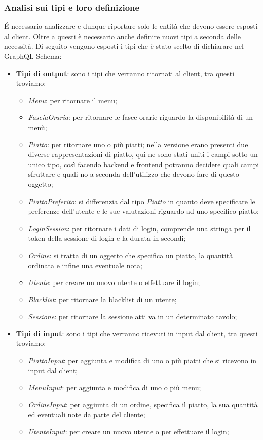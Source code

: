 \subsubsection*{Analisi sui tipi e loro definizione}
É necessario analizzare e dunque riportare solo le entità che devono essere esposti al client. Oltre a questi è necessario anche definire nuovi tipi a seconda delle necessità. Di seguito vengono esposti i tipi che è stato scelto di dichiarare nel GraphQL Schema:
\begin{itemize}
  \item \textbf{Tipi di output}: sono i tipi che verranno ritornati al client, tra questi troviamo:
  \begin{itemize}
    \item \textit{Menu}: per ritornare il menu;
    \item \textit{FasciaOraria}: per ritornare le fasce orarie riguardo la disponibilità di un menù;
    \item \textit{Piatto}: per ritornare uno o più piatti; nella versione erano presenti due diverse rappresentazioni di piatto, qui ne sono stati uniti i campi sotto un unico tipo, così facendo backend e frontend potranno decidere quali campi sfruttare e quali no a seconda dell'utilizzo che devono fare di questo oggetto;
    \item \textit{PiattoPreferito}: si differenzia dal tipo \textit{Piatto} in quanto deve specificare le preferenze dell'utente e le sue valutazioni riguardo ad uno specifico piatto;
    \item \textit{LoginSession}: per ritornare i dati di login, comprende una stringa per il token della sessione di login e la durata in secondi;
    \item \textit{Ordine}: si tratta di un oggetto che specifica un piatto, la quantità ordinata e infine una eventuale nota;
    \item \textit{Utente}: per creare un nuovo utente o effettuare il login;
    \item \textit{Blacklist}: per ritornare la blacklist di un utente;
    \item \textit{Sessione}: per ritornare la sessione atti va in un determinato tavolo;
  \end{itemize}
  \item \textbf{Tipi di input}: sono i tipi che verranno ricevuti in input dal client, tra questi troviamo:
  \begin{itemize}
    \item \textit{PiattoInput}: per aggiunta e modifica di uno o più piatti che si ricevono in input dal client;
    \item \textit{MenuInput}: per aggiunta e modifica di uno o più menu;
    \item \textit{OrdineInput}: per aggiunta di un ordine, specifica il piatto, la sua quantità ed eventuali note da parte del cliente;
    \item \textit{UtenteInput}: per creare un nuovo utente o per effettuare il login;
  \end{itemize}
\end{itemize}
